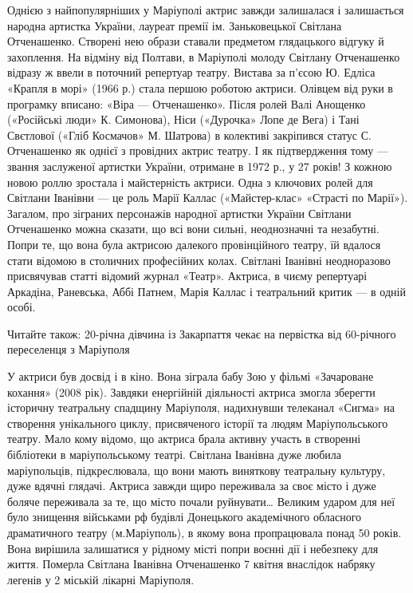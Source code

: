 Однією з найпопулярніших у Маріуполі актрис завжди залишалася і залишається
народна артистка України, лауреат премії ім. Заньковецької Світлана
Отченашенко. Створені нею образи ставали предметом глядацького відгуку й
захоплення. На відміну від Полтави, в Маріуполі молоду Світлану Отченашенко
відразу ж ввели в поточний репертуар театру. Вистава за п'єсою Ю. Едліса
«Крапля в морі» (1966 р.) стала першою роботою актриси. Олівцем від руки в
програмку вписано: «Віра — Отченашенко». Після ролей Валі Анощенко («Російські
люди» К. Симонова), Ніси («Дурочка» Лопе де Вега) і Тані Свєтлової («Гліб
Космачов» М. Шатрова) в колективі закріпився статус С. Отченашенко як однієї з
провідних актрис театру. І як підтвердження тому — звання заслуженої артистки
України, отримане в 1972 р., у 27 років! З кожною новою роллю зростала і
майстерність актриси. Одна з ключових ролей для Світлани Іванівни — це роль
Марії Каллас («Майстер-клас» «Страсті по Марії»). Загалом, про зіграних
персонажів народної артистки України Світлани Отченашенко можна сказати, що всі
вони сильні, неоднозначні та незабутні. Попри те, що вона була актрисою
далекого провінційного театру, їй вдалося стати відомою в столичних професійних
колах. Світлані Іванівні неодноразово присвячував статті відомий журнал
«Театр». Актриса, в чиєму репертуарі Аркадіна, Раневська, Аббі Патнем, Марія
Каллас і театральний критик — в одній особі.

Читайте також: 20-річна дівчина із Закарпаття чекає на первістка від 60-річного
переселенця з Маріуполя

У актриси був досвід і в кіно. Вона зіграла бабу Зою у фільмі «Зачароване
кохання» (2008 рік). Завдяки енергійній діяльності актриса змогла зберегти
історичну театральну спадщину Маріуполя, надихнувши телеканал «Сигма» на
створення унікального циклу, присвяченого історії та людям Маріупольського
театру. Мало кому відомо, що актриса брала активну участь в створенні
бібліотеки в маріупольському театрі. Світлана Іванівна дуже любила
маріупольців, підкреслювала, що вони мають виняткову театральну культуру, дуже
вдячні глядачі. Актриса завжди щиро переживала за своє місто і дуже боляче
переживала за те, що місто почали руйнувати… Великим ударом для неї було
знищення військами рф будівлі Донецького академічного обласного драматичного
театру (м.Маріуполь), в якому вона пропрацювала понад 50 років. Вона вирішила
залишатися у рідному місті попри воєнні дії і небезпеку для життя. Померла
Світлана Іванівна Отченашенко 7 квітня внаслідок набряку легенів у 2 міській
лікарні Маріуполя.

